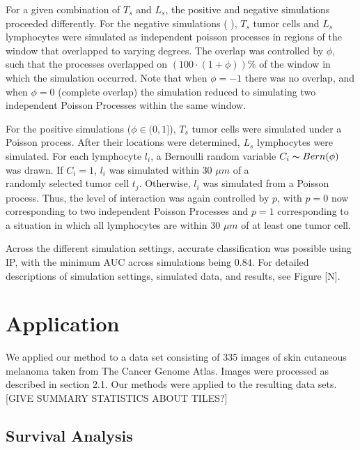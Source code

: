 \documentclass[
]{book}
\begin{document}
For a given combination of \(T_s\) and \(L_s\), the positive and negative
simulations proceeded differently. For the negative simulations (\phi
\in [-1, 0]), \(T_s\) tumor cells and \(L_s\) lymphocytes were simulated
as independent poisson processes in regions of the window that
overlapped to varying degrees. The overlap was controlled by \(\phi\),
such that the processes overlapped on \((100 \cdot (1 + \phi)) \%\) of the
window in which the simulation occurred. Note that when \(\phi = -1\)
there was no overlap, and when \(\phi = 0\) (complete overlap) the
simulation reduced to simulating two independent Poisson Processes
within the same window.

For the positive simulations (\(\phi \in (0, 1]\)), \(T_s\) tumor cells were
simulated under a Poisson process. After their locations were
determined, \(L_s\) lymphocytes were simulated. For each lymphocyte \(l_i\),
a Bernoulli random variable \(C_i \thicksim Bern(\phi)\) was drawn. If
\(C_i = 1\), \(l_i\) was simulated within \(30\) \(\mu m\) of a\\
randomly selected tumor cell \(t_j\). Otherwise, \(l_i\) was simulated from
a Poisson process. Thus, the level of interaction was again controlled
by \(p\), with \(p = 0\) now corresponding to two independent Poisson
Processes and \(p = 1\) corresponding to a situation in which all
lymphocytes are within \(30\) \(\mu m\) of at least one tumor cell.

Across the different simulation settings, accurate classification was
possible using IP, with the minimum AUC across simulations being \(0.84\).
For detailed descriptions of simulation settings, simulated data, and
results, see Figure {[}N{]}.

\hypertarget{application}{%
\section{Application}\label{application}}

We applied our method to a data set consisting of 335 images of skin
cutaneous melanoma taken from The Cancer Genome Atlas. Images were
processed as described in section 2.1. Our methods were applied to the
resulting data sets. {[}GIVE SUMMARY STATISTICS ABOUT TILES?{]}

\hypertarget{survival-analysis}{%
\subsection{Survival Analysis}\label{survival-analysis}}
\end{document}
